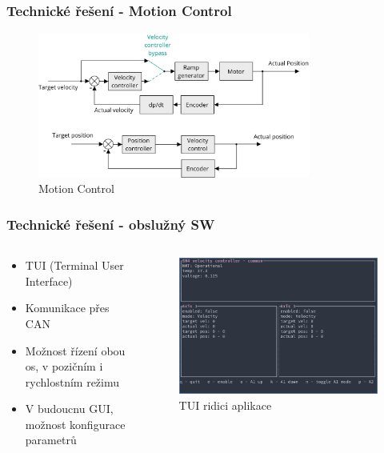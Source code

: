 \documentclass[%
  12pt,       				%
	t,                  %
	aspectratio=1610,   %
	unicode,						%
]{beamer}				    	%
\begin{document}
\begin{frame}
	\frametitle{Technické řešení - Motion Control}
	\begin{figure}%
		\centering
		\includegraphics[width=0.8\textwidth]{../Thesis/obrazky/motion_control}
		\caption{Motion Control}%
		\label{fig:sm4_block}
	\end{figure}
\end{frame}
\begin{frame}
	\frametitle{Technické řešení - obslužný SW}
	\begin{columns}[T] 								%
		\begin{column}{0.4\textwidth}
			\begin{itemize}
				\item TUI (Terminal User Interface)
				\item Komunikace přes CAN
				\item Možnost řízení obou os, v pozičním i rychlostním režimu
				\item V budoucnu GUI, možnost konfigurace parametrů
			\end{itemize}
		\end{column}
		\begin{column}{0.6\textwidth}		%
			\begin{figure}%
				\centering
				\includegraphics[width=0.8\columnwidth]{../Thesis/obrazky/tui}
				\caption{TUI ridici aplikace}%
				\label{fig:sm4_block}
			\end{figure}
		\end{column}
	\end{columns}
\end{frame}
\end{document}
